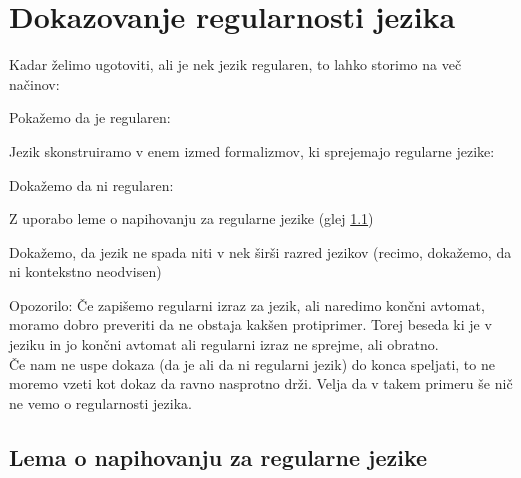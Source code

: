 \documentclass[10pt,a4paper,oneside]{book}
\begin{document}
\section{Dokazovanje regularnosti jezika}
Kadar želimo ugotoviti, ali je nek jezik regularen, to lahko storimo na več načinov:
\begin{items}
\item Pokažemo da je regularen:
	\begin{items}
	\item Jezik skonstruiramo v enem izmed formalizmov, ki sprejemajo regularne jezike:
		\begin{items}
		\item {}
		\item {}
		\item {}
		\end{items}
	\end{items}
\item Dokažemo da ni regularen:
	\begin{items}
	\item Z uporabo leme o napihovanju za regularne jezike (glej \ref{sec:Lema za RJ})
	\item Dokažemo, da jezik ne spada niti v nek širši razred jezikov (recimo, dokažemo, da ni kontekstno neodvisen)
	\end{items}
\end{items}
Opozorilo: Če zapišemo regularni izraz za jezik, ali naredimo končni avtomat, moramo dobro preveriti da ne obstaja kakšen protiprimer. Torej beseda ki je v jeziku in jo končni avtomat ali regularni izraz ne sprejme, ali obratno.\\
Če nam ne uspe dokaza (da je ali da ni regularni jezik) do konca speljati, to ne moremo vzeti kot dokaz da ravno nasprotno drži. Velja da v takem primeru še nič ne vemo o regularnosti jezika.

\subsection{Lema o napihovanju za regularne jezike}\label{sec:Lema za RJ}

\end{document}
